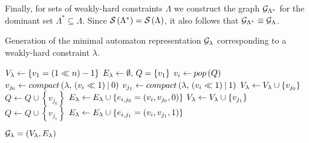 Finally, for sets of weakly-hard constraints $\Lambda$ we construct the graph $\mathcal{G}_{\Lambda^*}$ for the dominant set $\Lambda^* \subseteq \Lambda$. 
Since $\mathcal{S}_{}\left( \Lambda^* \right) = \mathcal{S}_{}\left( \Lambda \right)$, it also follows that $\mathcal{G}_{\Lambda^*} \equiv \mathcal{G}_{\Lambda}$.

\begin{algorithm}[t]\normalsize%
    \caption{Generation of the minimal automaton representation $\mathcal{G}_{\lambda}$ corresponding to a weakly-hard constraint $\lambda$.}
    \label{alg:tool:automata} 
    
    \begin{algorithmic}[1]
        \algnewcommand{}
    
            \State $V_{\lambda} \leftarrow \left\{ v_1 = \left( 1 \ll n \right) - 1 \right\}$
            \State $E_{\lambda} \leftarrow \emptyset,\, Q = \left\{ v_1 \right\}$
                \State $v_i \leftarrow pop\left( Q \right)$
                \State $v_{j_0} \leftarrow compact\left( \lambda,\, \left( v_i \ll 1 \right) \mathbin{|} 0 \right)$
                \State $v_{j_1} \leftarrow compact\left( \lambda,\, \left( v_i \ll 1 \right) \mathbin{|} 1 \right)$
                        \State $V_{\lambda} \leftarrow V_{\lambda} \cup \left\{ v_{j_0} \right\}$
                        \State $Q \leftarrow Q \cup \left\{ v_{j_0} \right\}$
                    \EndIf
                    \State $E_{\lambda} \leftarrow E_{\lambda} \cup \left\{ e_{i, j_0} = (v_i, v_{j_0}, 0) \right\}$
                \EndIf
                    \State $V_{\lambda} \leftarrow V_{\lambda} \cup \left\{ v_{j_1} \right\}$
                    \State $Q \leftarrow Q \cup \left\{ v_{j_1} \right\}$
                \EndIf
                \State $E_{\lambda} \leftarrow E_{\lambda} \cup \left\{ e_{i, j_1} = (v_i, v_{j_1}, 1) \right\}$
            \EndWhile
        
            \Return $\mathcal{G}_{\lambda} = \left( V_{\lambda}, E_{\lambda} \right)$
        \EndProcedure
    \end{algorithmic}
\end{algorithm}

